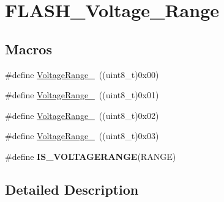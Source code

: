 \hypertarget{group___f_l_a_s_h___voltage___range}{\section{F\-L\-A\-S\-H\-\_\-\-Voltage\-\_\-\-Range}
\label{group___f_l_a_s_h___voltage___range}
}
\subsection*{Macros}
\begin{DoxyCompactItemize}
\item 
\#define \hyperlink{group___f_l_a_s_h___voltage___range_ga0ed013741f9d88425fe97da49f4980c1}{Voltage\-Range\-\_}~((uint8\-\_\-t)0x00)
\item 
\#define \hyperlink{group___f_l_a_s_h___voltage___range_ga4c080832b4c8c992acb645f2c39561e0}{Voltage\-Range\-\_}~((uint8\-\_\-t)0x01)
\item 
\#define \hyperlink{group___f_l_a_s_h___voltage___range_gadd249fb08c69b11cea3a6b7c22865b99}{Voltage\-Range\-\_}~((uint8\-\_\-t)0x02)
\item 
\#define \hyperlink{group___f_l_a_s_h___voltage___range_ga3197950f6bfefc8b9a784db5439a0498}{Voltage\-Range\-\_}~((uint8\-\_\-t)0x03)
\item 
\#define {\bfseries I\-S\-\_\-\-V\-O\-L\-T\-A\-G\-E\-R\-A\-N\-G\-E}(R\-A\-N\-G\-E)
\end{DoxyCompactItemize}


\subsection{Detailed Description}


